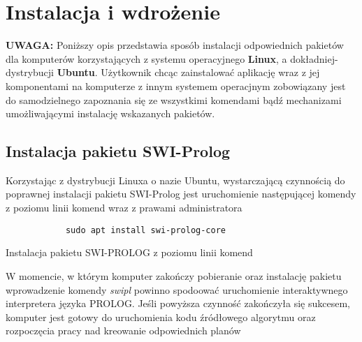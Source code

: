 \chapter{Instalacja i wdrożenie}
\thispagestyle{chapterBeginStyle}

\textbf{UWAGA:} Poniższy opis przedstawia sposób instalacji odpowiednich pakietów dla komputerów korzystających z systemu operacyjnego 
\textbf{Linux}, a dokładniej- dystrybucji \textbf{Ubuntu}. Użytkownik chcąc zainstalować aplikację wraz z jej komponentami na 
komputerze z innym systemem operacjnym zobowiązany jest do samodzielnego zapoznania się ze wszystkimi komendami bądź mechanizami 
umożliwającymi instalację wskazanych pakietów.

\section{Instalacja pakietu SWI-Prolog}
\label{SWI-PROLOGRozdzial}
    Korzystając z dystrybucji Linuxa o nazie Ubuntu, wystarczającą czynnością do poprawnej instalacji pakietu SWI-Prolog jest uruchomienie 
    następującej komendy z poziomu linii komend wraz z prawami administratora 
    \begin{listing}[H]
        \begin{verbatim}
            sudo apt install swi-prolog-core
        \end{verbatim}
        \caption{Instalacja pakietu SWI-PROLOG z poziomu linii komend}
    \end{listing}
    W momencie, w którym komputer zakończy pobieranie oraz instalację pakietu wprowadzenie komendy \textit{swipl} powinno spodoować uruchomienie 
    interaktywnego interpretera języka PROLOG. Jeśli powyższa czynność zakończyła się sukcesem, komputer jest gotowy do uruchomienia kodu źródłowego 
    algorytmu oraz rozpoczęcia pracy nad kreowanie odpowiednich planów

